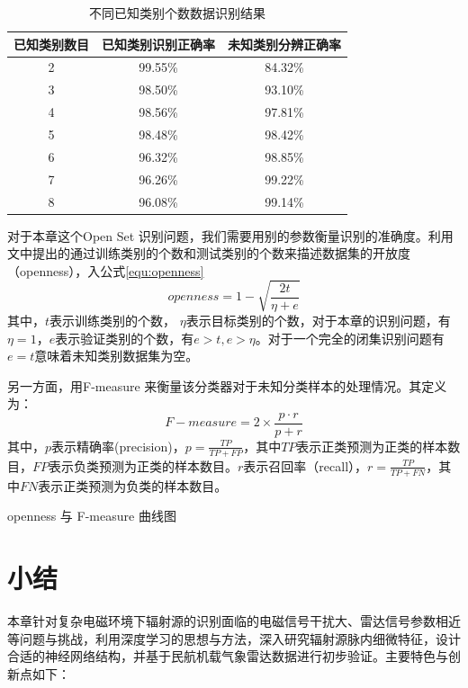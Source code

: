 \begin{table}[H]
	\renewcommand{\arraystretch}{1.3}
	\caption{不同已知类别个数数据识别结果}
	\label{tab:nb_classes}
	\centering
	\begin{tabular}{ccc}
		\hline
		 已知类别数目 & 已知类别识别正确率 & 未知类别分辨正确率 \\
		\hline
		2 & 99.55\% & 84.32\% \\
		3 & 98.50\% & 93.10\% \\		
		4 & 98.56\% & 97.81\% \\		
		5 & 98.48\% & 98.42\% \\		
		6 & 96.32\% & 98.85\% \\		
		7 & 96.26\% & 99.22\% \\		
		8 & 96.08\% & 99.14\% \\		
		\hline
	\end{tabular}
\end{table}

对于本章这个Open Set 识别问题，我们需要用别的参数衡量识别的准确度。利用文\cite{scheirer2013toward}中提出的通过训练类别的个数和测试类别的个数来描述数据集的开放度（openness），入公式\ref{equ:openness}
\begin{equation}
	openness = 1-\sqrt{\frac{2t}{\eta+e}}
	\label{equ:openness}
\end{equation}
其中，$t$表示训练类别的个数， $\eta $表示目标类别的个数，对于本章的识别问题，有$\eta=1$，$e$表示验证类别的个数，有$e>t,e>\eta$。对于一个完全的闭集识别问题有$e=t$意味着未知类别数据集为空。

另一方面，用F-measure 来衡量该分类器对于未知分类样本的处理情况。其定义为：
\begin{equation}
	F-measure=2\times\frac{p\cdot r}{p+r}
\end{equation}
其中，$p$表示精确率(precision)，$p=\frac{TP}{TP+FP}$，其中$TP$表示正类预测为正类的样本数目，$FP$表示负类预测为正类的样本数目。$r$表示召回率（recall），$r=\frac{TP}{TP+FN}$，其中$FN$表示正类预测为负类的样本数目。

openness 与 F-measure 曲线图

\section{小结}
本章针对复杂电磁环境下辐射源的识别面临的电磁信号干扰大、雷达信号参数相近等问题与挑战，利用深度学习的思想与方法，深入研究辐射源脉内细微特征，设计合适的神经网络结构，并基于民航机载气象雷达数据进行初步验证。主要特色与创新点如下：

